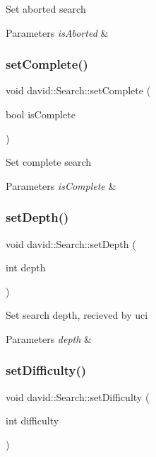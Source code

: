 Set aborted search 
\begin{DoxyParams}{Parameters}
{\em is\+Aborted} & \\
\hline
\end{DoxyParams}
\mbox{\label{classdavid_1_1Search_ad473d052f9123762c1636ef04a7ecdde}} 
\subsubsection{\texorpdfstring{set\+Complete()}{setComplete()}}
{\footnotesize\ttfamily void david\+::\+Search\+::set\+Complete (\begin{DoxyParamCaption}\item[{bool}]{is\+Complete }\end{DoxyParamCaption})}

Set complete search 
\begin{DoxyParams}{Parameters}
{\em is\+Complete} & \\
\hline
\end{DoxyParams}
\mbox{\label{classdavid_1_1Search_a4c3398fb13ce8c3bc477ded05f75ec0e}} 
\subsubsection{\texorpdfstring{set\+Depth()}{setDepth()}}
{\footnotesize\ttfamily void david\+::\+Search\+::set\+Depth (\begin{DoxyParamCaption}\item[{int}]{depth }\end{DoxyParamCaption})}

Set search depth, recieved by uci 
\begin{DoxyParams}{Parameters}
{\em depth} & \\
\hline
\end{DoxyParams}
\mbox{\label{classdavid_1_1Search_a84aaba374418b295f0a0cfed676114b4}} 
\subsubsection{\texorpdfstring{set\+Difficulty()}{setDifficulty()}}
{\footnotesize\ttfamily void david\+::\+Search\+::set\+Difficulty (\begin{DoxyParamCaption}\item[{int}]{difficulty }\end{DoxyParamCaption})}

